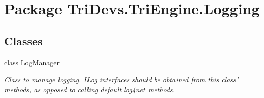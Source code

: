 \hypertarget{namespace_tri_devs_1_1_tri_engine_1_1_logging}{\section{Package Tri\-Devs.\-Tri\-Engine.\-Logging}
\label{namespace_tri_devs_1_1_tri_engine_1_1_logging}
}
\subsection*{Classes}
\begin{DoxyCompactItemize}
\item 
class \hyperlink{class_tri_devs_1_1_tri_engine_1_1_logging_1_1_log_manager}{Log\-Manager}
\begin{DoxyCompactList}\small\item\em Class to manage logging. I\-Log interfaces should be obtained from this class' methods, as opposed to calling default log4net methods. \end{DoxyCompactList}\end{DoxyCompactItemize}

